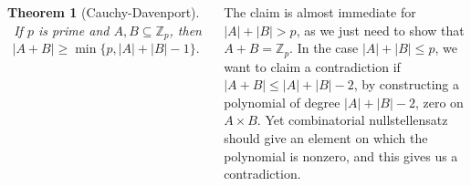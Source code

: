 \documentclass{tikzposter} %
\newtheorem{theorem}{Theorem}
\begin{document}
\begin{columns}
{    \begin{theorem}[Cauchy-Davenport]
    \ If $p$ is prime and $A, B \subseteq \mathbb{Z}_p$, then
    \begin{align*}
      |A + B| \ge \min \{p, |A|+|B|-1\}.
    \end{align*}
    \end{theorem}
    \hphantom{}

    The claim is almost immediate for $|A|+|B| > p$, as we just need to show that $A + B = \mathbb{Z}_p$. In the case $|A| + |B| \le p$, we want to claim a contradiction if $|A+B| \le |A|+|B|-2$, by constructing a polynomial of degree $|A|+|B|-2$, zero on $A \times B$. Yet combinatorial nullstellensatz should give an element on which the polynomial is nonzero, and this gives us a contradiction.
    }


\end{columns}
\end{document}
